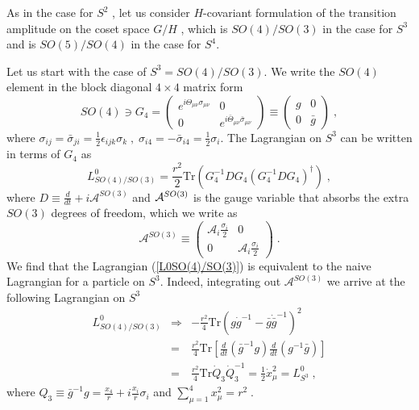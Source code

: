 \documentclass[12pt,a4paper]{article}
\begin{document}
As in the case for $S^{2}$ , let us consider $H$-covariant formulation of
the transition amplitude on the coset space $G/H$ , which is $SO(4)/SO(3)$
in the case for $S^3$ and is $SO(5)/SO(4)$ in the case for $S^4$. 

Let us start with the case of $S^{3}=SO(4)/SO(3)$. We write the $SO(4)$
element in the block diagonal $4\times 4$ matrix form 
\begin{equation}
SO(4)\ni G_{4}=\left( 
\begin{array}{cc}
e^{i\Theta _{\mu \nu }\sigma _{\mu \nu }} & 0 \\ 
0 & e^{i\bar{\Theta}_{\mu \nu }\bar{\sigma}_{\mu \nu }}
\end{array}
\right) \equiv \left( 
\begin{array}{cc}
g & 0 \\ 
0 & \bar{g}
\end{array}
\right) \;,
\end{equation}
where $\sigma _{ij}=\bar{\sigma}_{ji}=\frac{1}{2}\epsilon _{ijk}\sigma
_{k}\;,\;\sigma _{i4}=-\bar{\sigma}_{i4}=\frac{1}{2}\sigma _{i}$. The
Lagrangian on $S^{3}$ can be written in terms of $G_{4}$ as 
\begin{equation}
L_{SO(4)/SO(3)}^{0}={\frac{r^{2}}{2}}\mathrm{Tr}%
(G_{4}^{-1}DG_{4}(G_{4}^{-1}DG_{4})^{\dagger })\;,  \label{L0SO(4)/SO(3)}
\end{equation}
where $D\equiv \displaystyle\frac{d}{dt}+i\mathcal{A}^{SO(3)}$ and $\mathcal{%
A}^{SO(3)}$ is the gauge variable that absorbs the extra $SO(3)$ degrees of
freedom, which we write as 
\begin{equation}
\mathcal{A}^{SO(3)}\equiv \left( 
\begin{array}{cc}
\mathcal{A}_{i}\frac{\sigma _{i}}{2} & 0 \\ 
0 & \mathcal{A}_{i}\frac{\sigma _{i}}{2}
\end{array}
\right) \;.
\end{equation}
We find that the Lagrangian (\ref{L0SO(4)/SO(3)}) is equivalent to the naive
Lagrangian for a particle on $S^{3}$. Indeed, integrating out $\mathcal{A}%
^{SO(3)}$ we arrive at the following Lagrangian on $S^{3}$%
\begin{eqnarray}
L_{SO(4)/SO(3)}^{0} &\Rightarrow &-{\frac{r^{2}}{4}}\mathrm{Tr}(g\dot{g}%
^{-1}-\bar{g}\dot{\bar{g}}^{-1})^{2}  \nonumber \\
&=&{\frac{r^{2}}{4}}\mathrm{Tr}\left[ {\frac{d}{dt}}{(\bar{g}^{-1}g)}{\frac{d%
}{dt}}{(g^{-1}\bar{g})}\right] \\
&=&{\frac{r^{2}}{4}}\mathrm{Tr}\dot{Q}_{3}\dot{Q}_{3}^{-1}=\frac{1}{2}\dot{x}%
_{\mu }^{2}=L_{S^{3}}^{0}\;,  \nonumber
\end{eqnarray}
where $Q_{3}\equiv \bar{g}^{-1}g=\displaystyle\frac{x_{4}}{r}+i\displaystyle%
\frac{x_{i}}{r}\sigma _{i}$ and $\displaystyle\sum_{\mu =1}^{4}x_{\mu
}^{2}=r^{2}\;.$
\end{document}
